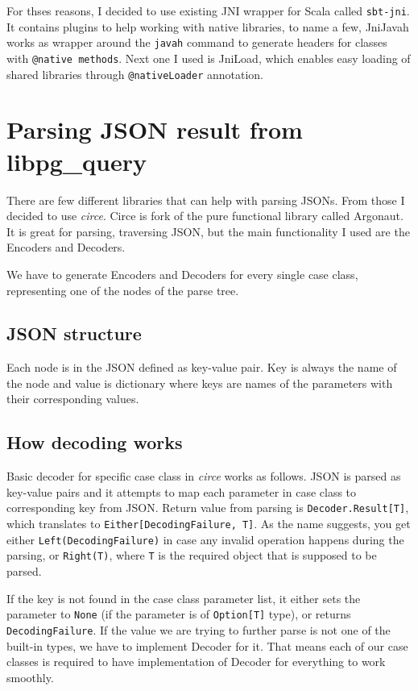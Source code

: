 \documentclass[thesis=B,english]{FITthesis}[2019/12/23]
\begin{document}
For thses reasons, I decided to use existing JNI wrapper for Scala called \texttt{sbt-jni}. It contains plugins to help working with native libraries, to name a few, JniJavah works as wrapper around the \texttt{javah} command to generate headers for classes with \texttt{@native methods}. Next one I used is JniLoad, which enables easy loading of shared libraries through \texttt{@nativeLoader} annotation.


\section{Parsing JSON result from libpg\_query}
There are few different libraries that can help with parsing JSONs. From those I decided to use \textit{circe}. Circe is fork of the pure functional library called Argonaut. It is great for parsing, traversing JSON, but the main functionality I used are the Encoders and Decoders. 

We have to generate Encoders and Decoders for every single case class, representing one of the nodes of the parse tree. 

\subsection{JSON structure}
Each node is in the JSON defined as key-value pair. Key is always the name of the node and value is dictionary where keys are names of the parameters with their corresponding values. 


\subsection{How decoding works}
Basic decoder for specific case class in \textit{circe} works as follows. JSON is parsed as key-value pairs and it attempts to map each parameter in case class to corresponding key from JSON. Return value from parsing is \texttt{Decoder.Result[T]}, which translates to \texttt{Either[DecodingFailure, T]}. As the name suggests, you get either \texttt{Left(DecodingFailure)} in case any invalid operation happens during the parsing, or \texttt{Right(T)}, where \texttt{T} is the required object that is supposed to be parsed. 

If the key is not found in the case class parameter list, it either sets the parameter to \texttt{None} (if the parameter is of \texttt{Option[T]} type), or returns \texttt{DecodingFailure}. If the value we are trying to further parse is not one of the built-in types, we have to implement Decoder for it. That means each of our case classes is required to have implementation of Decoder for everything to work smoothly.
\end{document}
